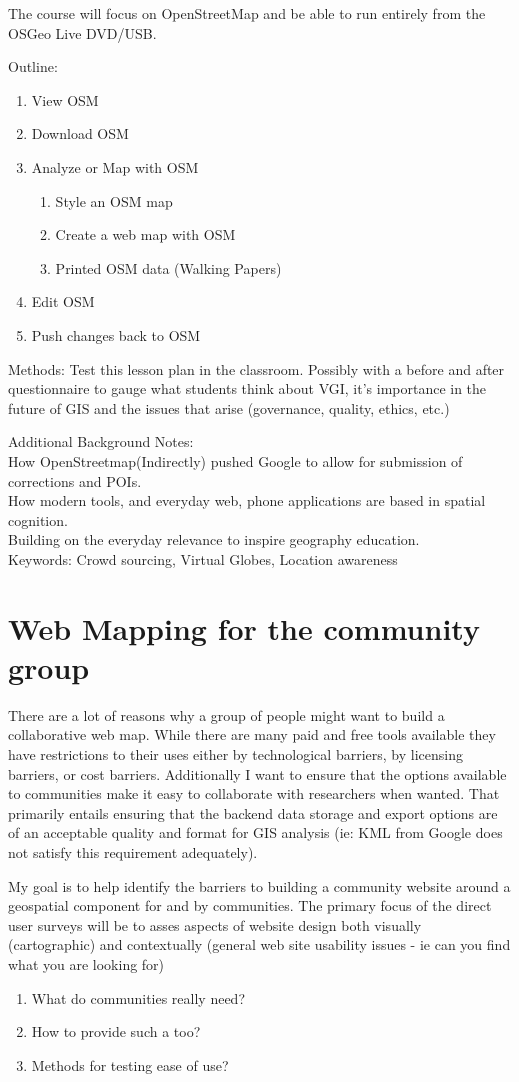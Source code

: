 \documentclass[12pt,letterpaper]{article}
\begin{document}
The course will focus on OpenStreetMap and be able to run entirely from the OSGeo Live DVD/USB.

Outline:
\begin{enumerate}
\item View OSM
\item Download OSM
\item Analyze or Map with OSM
	\begin{enumerate}
	\item Style an OSM map
	\item Create a web map with OSM
	\item Printed OSM data (Walking Papers)
	\end{enumerate}
\item Edit OSM
\item Push changes back to OSM
\end{enumerate}
Methods: Test this lesson plan in the classroom. Possibly with a before and after questionnaire to gauge what students think about VGI, it's importance in the future of GIS and the issues that arise (governance, quality, ethics, etc.)

Additional Background Notes:
\\ How OpenStreetmap(Indirectly) pushed Google to allow for submission of corrections and POIs.
\\ How modern tools, and everyday web, phone applications are based in spatial cognition.
\\ Building on the everyday relevance to inspire geography education.
\\ Keywords: Crowd sourcing, Virtual Globes, Location awareness

\section{Web Mapping for the community group}
	There are a lot of reasons why a group of people might want to build a collaborative web map. While there are many paid and free tools available they have restrictions to their uses either by technological barriers, by licensing barriers, or cost barriers. Additionally I want to ensure that the options available to communities make it easy to collaborate with researchers when wanted. That primarily entails ensuring that the backend data storage and export options are of an acceptable quality and format for GIS analysis (ie: KML from Google does not satisfy this requirement adequately).
	
My goal is to help identify the barriers to building a community website around a geospatial component for and by communities. The primary focus of the direct user surveys will be to asses aspects of website design both visually (cartographic) and contextually (general web site usability issues - ie can you find what you are looking for)
\begin{enumerate}
\item What do communities really need?
\item How to provide such a too?
\item Methods for testing ease of use?
\end{enumerate}
\end{document}
